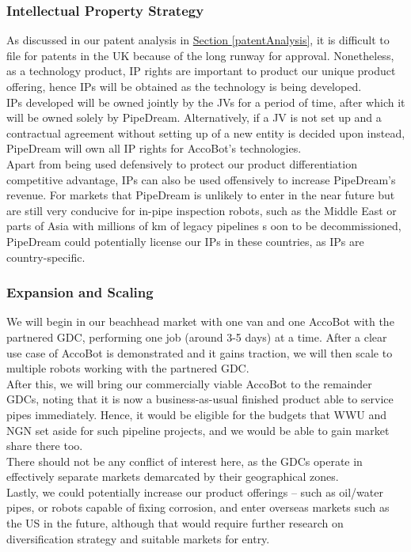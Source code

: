 \documentclass[11pt]{article}		%
\newcommand{\sectref}[1]{\hyperref[#1]{Section \ref*{#1}}}     %
\begin{document}
    	\subsubsection{Intellectual Property Strategy}
    	As discussed in our patent analysis in \sectref{patentAnalysis}, it is difficult to file for patents in the UK because of the long runway for approval. Nonetheless, as a technology product, IP rights are important to product our unique product offering, hence IPs will be obtained as the technology is being developed.
        \\ \hspace*{3ex}IPs developed will be owned jointly by the JVs for a period of time, after which it will be owned solely by PipeDream. Alternatively, if a JV is not set up and a contractual agreement without setting up of a new entity is decided upon instead, PipeDream will own all IP rights for AccoBot’s technologies. 
        \\ \hspace*{3ex}Apart from being used defensively to protect our product differentiation competitive advantage, IPs can also be used offensively to increase PipeDream’s revenue. For markets that PipeDream is unlikely to enter in the near future but are still very conducive for in-pipe inspection robots, such as the Middle East or parts of Asia with millions of km of legacy pipelines s oon to be decommissioned, PipeDream could potentially license our IPs in these countries, as IPs are country-specific. 
    
    	\subsubsection{Expansion and Scaling}
    	We will begin in our beachhead market with one van and one AccoBot with the partnered GDC, performing one job (around 3-5 days) at a time. After a clear use case of AccoBot is demonstrated and it gains traction, we will then scale to multiple robots working with the partnered GDC.
        \\ \hspace*{3ex}After this, we will bring our commercially viable AccoBot to the remainder GDCs, noting that it is now a business-as-usual finished product able to service pipes immediately. Hence, it would be eligible for the budgets that WWU and NGN set aside for such pipeline projects, and we would be able to gain market share there too. 
        \\ \hspace*{3ex}There should not be any conflict of interest here, as the GDCs operate in effectively separate markets demarcated by their geographical zones. 
        \\ \hspace*{3ex}Lastly, we could potentially increase our product offerings – such as oil/water pipes, or robots capable of fixing corrosion, and enter overseas markets such as the US in the future, although that would require further research on diversification strategy and suitable markets for entry. 
    
\end{document}
